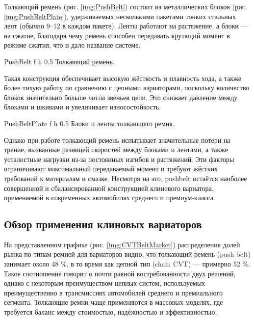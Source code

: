 Толкающий ремень (рис. \ref{img:PushBelt}) состоит из металлических блоков (рис. \ref{img:PushBeltPlate}), удерживаемых несколькими пакетами тонких стальных лент (обычно 9–12 в каждом пакете). Ленты работают на растяжение, а блоки — на сжатие, благодаря чему ремень способен передавать крутящий момент в режиме сжатия, что и дало название системе.

    {PushBelt} %
    {f} %
    {h} %
    {0.5\textwidth} %
    {Толкающий ремень.} %

Такая конструкция обеспечивает высокую жёсткость и плавность хода, а также более тихую работу по сравнению с цепными вариаторами, поскольку количество блоков значительно больше числа звеньев цепи. Это снижает давление между блоками и шкивами и увеличивает износостойкость.

    {PushBeltPlate} %
    {f} %
    {h} %
    {0.5\textwidth} %
    {Блоки и ленты толкающего ремня.} %

Однако при работе толкающий ремень испытывает значительные потери на трение, вызванные разницей скоростей между блоками и лентами, а также усталостные нагрузки из-за постоянных изгибов и растяжений. Эти факторы ограничивают максимальный передаваемый момент и требуют жёстких требований к материалам и смазке. Несмотря на это, pushbelt остаётся наиболее совершенной и сбалансированной конструкцией клинового вариатора, применяемой в современных автомобилях среднего и премиум-класса.

\subsection{Обзор применения клиновых вариаторов}

На представленном графике (рис. \ref{img:CVTBeltMarket}) распределения долей рынка по типам ремней для вариаторов видно, что толкающий ремень (push belt) занимает около 48 \%, в то время как цепной тип (chain CVT) — примерно 52 \%. Такое соотношение говорит о почти равной востребованности двух решений, однако с некоторым преимуществом цепных систем, используемых преимущественно в трансмиссиях автомобилей среднего и премиального сегмента. Толкающие ремни чаще применяются в массовых моделях, где требуется баланс между стоимостью, надёжностью и эффективностью.


